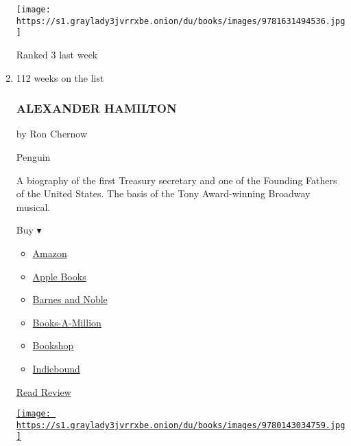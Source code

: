 \begin{enumerate}
  \texttt{[image: https://s1.graylady3jvrrxbe.onion/du/books/images/9781631494536.jpg]}

  Ranked 3 last week
\item
  \href{https://www.nytimes3xbfgragh.onion/2004/04/22/books/books-of-the-times-inspired-windbag-who-molded-the-us-government.html}{}

  112 weeks on the list

  \hypertarget{alexander-hamilton}{%
  \subsubsection{ALEXANDER HAMILTON}\label{alexander-hamilton}}

  by Ron Chernow

  Penguin

  A biography of the first Treasury secretary and one of the Founding
  Fathers of the United States. The basis of the Tony Award-winning
  Broadway musical.

  Buy ▾

  \begin{itemize}
  \tightlist
  \item
    \href{http://www.amazon.com/Alexander-Hamilton-Ron-Chernow-ebook/dp/B000QJLQZI?tag=NYTBS-20}{Amazon}
  \item
    \href{https://du-gae-books-dot-nyt-du-prd.appspot.com/buy?title=ALEXANDER+HAMILTON\&author=Ron+Chernow}{Apple
    Books}
  \item
    \href{https://www.anrdoezrs.net/click-7990613-11819508?url=https\%3A\%2F\%2Fwww.barnesandnoble.com\%2Fw\%2F\%3Fean\%3D9780143034759}{Barnes
    and Noble}
  \item
    \href{https://www.anrdoezrs.net/click-7990613-35140?url=https\%3A\%2F\%2Fwww.booksamillion.com\%2Fp\%2FALEXANDER\%2BHAMILTON\%2FRon\%2BChernow\%2F9780143034759}{Books-A-Million}
  \item
    \href{https://bookshop.org/a/3546/9780143034759}{Bookshop}
  \item
    \href{https://www.indiebound.org/book/9780143034759?aff=NYT}{Indiebound}
  \end{itemize}

  \href{https://www.nytimes3xbfgragh.onion/2004/04/22/books/books-of-the-times-inspired-windbag-who-molded-the-us-government.html}{Read
  Review}

  \href{https://www.nytimes3xbfgragh.onion/2004/04/22/books/books-of-the-times-inspired-windbag-who-molded-the-us-government.html}{\texttt{[image: https://s1.graylady3jvrrxbe.onion/du/books/images/9780143034759.jpg]}}


\end{enumerate}
